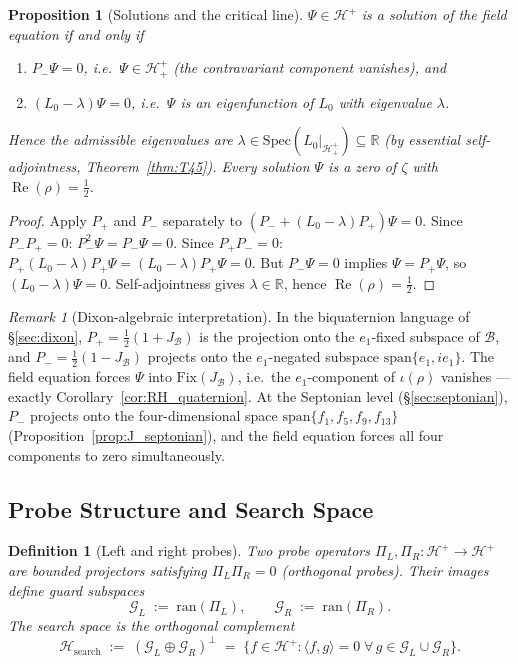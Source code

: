 \documentclass[12pt,a4paper]{article}
\newtheorem{proposition}[theorem]{Proposition}
\newtheorem{definition}[theorem]{Definition}
\theoremstyle{remark}
\newtheorem*{remark}{Remark}
\begin{document}
\begin{proposition}[Solutions and the critical line]\label{prop:field_eq_solutions}
$\Psi\in\mathcal{H}^+$ is a solution of the field equation if and only if
\begin{enumerate}[label=(\roman*),leftmargin=*]
\item $P_-\Psi = 0$, i.e.\ $\Psi\in\mathcal{H}^+_+$
  (the contravariant component vanishes), \emph{and}
\item $(L_0-\lambda)\Psi = 0$, i.e.\ $\Psi$ is an eigenfunction of
  $L_0$ with eigenvalue $\lambda$.
\end{enumerate}
Hence the admissible eigenvalues are
$\lambda\in\mathrm{Spec}(L_0|_{\mathcal{H}^+_+})\subseteq\mathbb{R}$
(by essential self-adjointness, Theorem~\ref{thm:T45}).
Every solution $\Psi$ is a zero of $\zeta$ with
$\operatorname{Re}(\rho)=\tfrac{1}{2}$.
\end{proposition}
\begin{proof}
Apply $P_+$ and $P_-$ separately to $(P_-+(L_0-\lambda)P_+)\Psi=0$.
Since $P_-P_+=0$: $P_-^2\Psi=P_-\Psi=0$.
Since $P_+P_-=0$: $P_+(L_0-\lambda)P_+\Psi=(L_0-\lambda)P_+\Psi=0$.
But $P_-\Psi=0$ implies $\Psi=P_+\Psi$, so $(L_0-\lambda)\Psi=0$.
Self-adjointness gives $\lambda\in\mathbb{R}$, hence
$\operatorname{Re}(\rho)=\tfrac{1}{2}$.
\end{proof}

\begin{remark}[Dixon-algebraic interpretation]
In the biquaternion language of \S\ref{sec:dixon},
$P_+ = \tfrac{1}{2}(1+J_{\mathcal{B}})$ is the projection onto the
$e_1$-fixed subspace of $\mathcal{B}$, and
$P_- = \tfrac{1}{2}(1-J_{\mathcal{B}})$ projects onto the
$e_1$-negated subspace $\mathrm{span}\{e_1, ie_1\}$.
The field equation forces $\Psi$ into $\mathrm{Fix}(J_{\mathcal{B}})$,
i.e.\ the $e_1$-component of $\iota(\rho)$ vanishes — exactly
Corollary~\ref{cor:RH_quaternion}.
At the Septonian level (\S\ref{sec:septonian}), $P_-$ projects onto
the four-dimensional space $\mathrm{span}\{f_1,f_5,f_9,f_{13}\}$
(Proposition~\ref{prop:J_septonian}), and the field equation forces
all four components to zero simultaneously.
\end{remark}

\subsection*{Probe Structure and Search Space}

\begin{definition}[Left and right probes]\label{def:probes}
Two \emph{probe operators} $\Pi_L, \Pi_R:\mathcal{H}^+\to\mathcal{H}^+$
are bounded projectors satisfying $\Pi_L\Pi_R=0$ (orthogonal probes).
Their images define \emph{guard subspaces}
\[
  \mathcal{G}_L \;:=\; \mathrm{ran}(\Pi_L),
  \qquad
  \mathcal{G}_R \;:=\; \mathrm{ran}(\Pi_R).
\]
The \emph{search space} is the orthogonal complement
\[
  \mathcal{H}_{\mathrm{search}}
  \;:=\; (\mathcal{G}_L \oplus \mathcal{G}_R)^\perp
  \;=\; \{f\in\mathcal{H}^+ : \langle f,g\rangle=0
    \;\forall\, g\in\mathcal{G}_L\cup\mathcal{G}_R\}.
\]
\end{definition}
\end{document}

